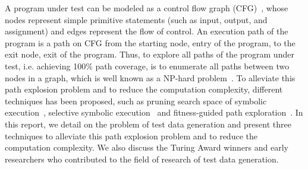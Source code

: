 A program under test can be modeled as a control flow graph (CFG)~\cite{testbook}, whose nodes represent simple primitive statements (such as input, output, and assignment) and edges represent the flow of control. An execution path of the program is a path on CFG from the starting node, entry of the program, to the exit node, exit of the program. Thus, to explore all paths of the program under test, i.e. achieving 100\% path coverage, is to enumerate all paths between two nodes in a graph, which is well known as a NP-hard problem~\cite{graph}. To alleviate this path explosion problem and to reduce the computation complexity, different techniques has been proposed, such as pruning search space of symbolic execution~\cite{prune}, selective symbolic execution~\cite{selective} and fitness-guided path exploration~\cite{fitness}. In this report, we detail on the problem of test data generation and present three techniques to alleviate this path explosion problem and to reduce the computation complexity. We also discuss the Turing Award winners and early researchers who contributed to the field of research of test data generation.